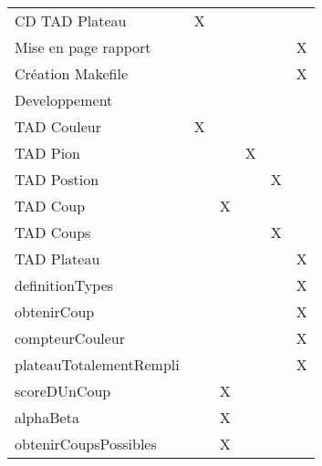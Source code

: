 \documentclass{article}
\begin{document}
\begin{tabular}{|l|c|c|c|c|c|}
  CD TAD Plateau & X & & & & \\                              
  Mise en page rapport & & & & & X \\      
  Création Makefile & & & & & X \\
  \hline
  Developpement \\
  \hline
  TAD Couleur & X & & & & \\                                                                                                                                                                       
  TAD Pion & & & X & & \\                                                                                                                                                                              
  TAD Postion & & & & X &  \\                                                                                                                                                                          
  TAD Coup & & X & &  & \\                                                                                                                                                                              
  TAD Coups & & & & X & \\                                                                                                                                                                             
  TAD Plateau & & & & & X \\                                                                                                                                                                      
  definitionTypes & & & & & X \\
  obtenirCoup & & & & & X \\
  compteurCouleur & & & & & X \\
  plateauTotalementRempli & & & & & X \\
  scoreDUnCoup & & X & & & \\
  alphaBeta & & X & & & \\
  obtenirCoupsPossibles & & X & & & \\
  \hline                        
\end{tabular}             
\end{document}
